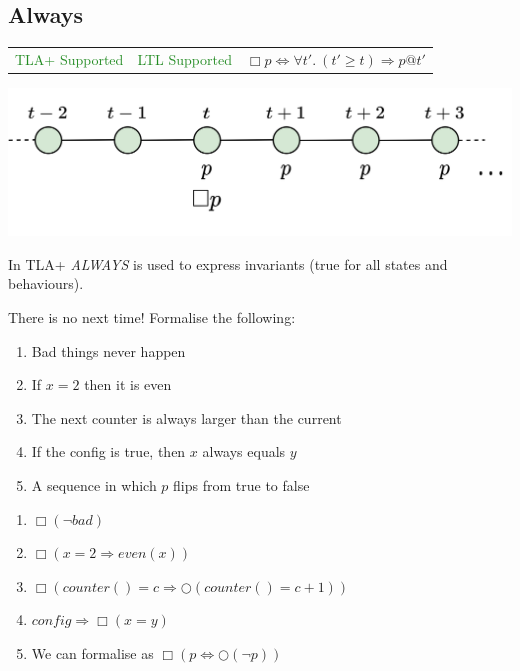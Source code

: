 \subsection{Always}
\begin{tabular}{c | c r}
    \textcolor{ForestGreen}{TLA+ Supported} & \textcolor{ForestGreen}{LTL Supported} & $\Box p \Leftrightarrow \forall t'. \ (t' \geq t) \Rightarrow p@t'$ \\
\end{tabular}
\begin{center}
    \includegraphics[width=.7\textwidth]{linear_time_logic/images/always_operator.drawio.png}
\end{center}
In TLA+ \textit{ALWAYS} is used to express invariants (true for all states and behaviours).
\begin{examplebox}{There is no next time!}
    Formalise the following:
    \begin{enumerate}
        \item Bad things never happen
        \item If $x = 2$ then it is even
        \item The next counter is always larger than the current
        \item If the config is true, then $x$ always equals $y$
        \item A sequence in which $p$ flips from true to false
    \end{enumerate}
    \tcblower
    \begin{enumerate}
        \item $\Box(\neg bad)$
        \item $\Box(x = 2 \Rightarrow even(x))$
        \item $\Box(counter() = c \Rightarrow \bigcirc (counter() = c + 1))$
        \item $config \Rightarrow \Box(x = y)$
        \item We can formalise as $\Box(p \Leftrightarrow \bigcirc (\neg p))$
    \end{enumerate}
\end{examplebox}

